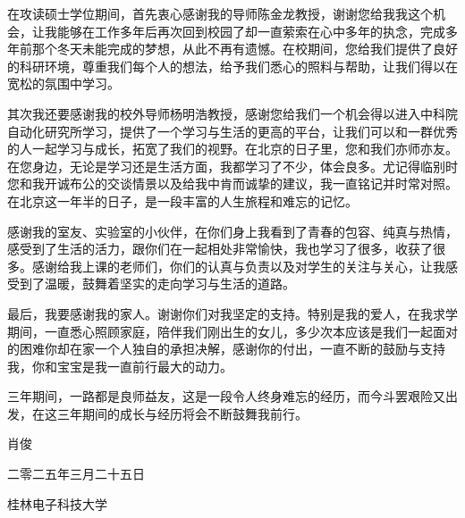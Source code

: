 %
% 
%

在攻读硕士学位期间，首先衷心感谢我的导师陈金龙教授，谢谢您给我我这个机会，让我能够在工作多年后再次回到校园了却一直萦索在心中多年的执念，完成多年前那个冬天未能完成的梦想，从此不再有遗憾。在校期间，您给我们提供了良好的科研环境，尊重我们每个人的想法，给予我们悉心的照料与帮助，让我们得以在宽松的氛围中学习。

其次我还要感谢我的校外导师杨明浩教授，感谢您给我们一个机会得以进入中科院自动化研究所学习，提供了一个学习与生活的更高的平台，让我们可以和一群优秀的人一起学习与成长，拓宽了我们的视野。在北京的日子里，您和我们亦师亦友。在您身边，无论是学习还是生活方面，我都学习了不少，体会良多。尤记得临别时您和我开诚布公的交谈情景以及给我中肯而诚挚的建议，我一直铭记并时常对照。在北京这一年半的日子，是一段丰富的人生旅程和难忘的记忆。

感谢我的室友、实验室的小伙伴，在你们身上我看到了青春的包容、纯真与热情，感受到了生活的活力，跟你们在一起相处非常愉快，我也学习了很多，收获了很多。感谢给我上课的老师们，你们的认真与负责以及对学生的关注与关心，让我感受到了温暖，鼓舞着坚实的走向学习与生活的道路。

最后，我要感谢我的家人。谢谢你们对我坚定的支持。特别是我的爱人，在我求学期间，一直悉心照顾家庭，陪伴我们刚出生的女儿，多少次本应该是我们一起面对的困难你却在家一个人独自的承担决解，感谢你的付出，一直不断的鼓励与支持我，你和宝宝是我一直前行最大的动力。

三年期间，一路都是良师益友，这是一段令人终身难忘的经历，而今斗罢艰险又出发，在这三年期间的成长与经历将会不断鼓舞我前行。
\vspace{1em}
\begin{flushright}
    肖俊\enspace 

    二零二五年\enspace 三月二十五日\enspace 
    
    桂林电子科技大学\enspace 
\end{flushright}